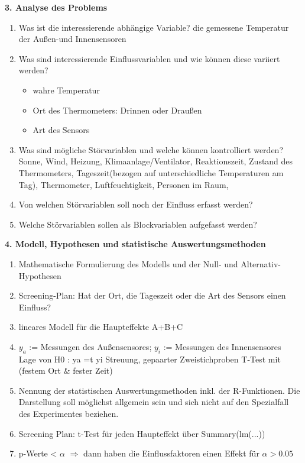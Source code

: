 \documentclass[ ngerman, fontsize= 12pt, paper=a4, headings=big, titlepage=true]{article}
\begin{document}
\textbf{3. Analyse des Problems}
\begin{enumerate}[-]
\item Was ist die interessierende abhängige Variable?
	die gemessene Temperatur der Außen-und Innensensoren
\item Was sind interessierende Einflussvariablen und wie können diese variiert werden? \\
\begin{itemize}
	\item wahre Temperatur\\
	\item Ort des Thermometers: Drinnen oder Draußen
	\item Art des Sensors 
\end{itemize}



\item Was sind mögliche Störvariablen und welche können kontrolliert werden?\\
Sonne, Wind, Heizung, Klimaanlage/Ventilator, Reaktionszeit, Zustand des Thermometers,  Tageszeit(bezogen auf unterschiedliche Temperaturen am Tag), Thermometer, Luftfeuchtigkeit, Personen im Raum,
\item Von welchen Störvariablen soll noch der Einfluss erfasst werden? \\
\item Welche Störvariablen sollen als Blockvariablen aufgefasst werden? \\
\end{enumerate}

\textbf{4. Modell, Hypothesen und statistische Auswertungsmethoden}
\begin{enumerate}[-]
\item  Mathematische Formulierung des Modells und der Null- und Alternativ-Hypothesen \\
\item Screening-Plan: Hat der Ort, die Tageszeit oder die Art des Sensors einen Einfluss?
\item lineares Modell für die Haupteffekte A+B+C
\item  $y_a$ := Messungen des Außensensores; $y_i$ := Messungen des Innensensores \\
Lage von H0 : ya =t yi Streuung, gepaarter Zweistichproben T-Test mit (festem Ort \& fester Zeit)

\item Nennung der statistischen Auswertungsmethoden inkl. der R-Funktionen. Die Darstellung soll möglichst allgemein sein und sich nicht auf den Spezialfall des Experimentes beziehen. \\

\item Screening Plan: t-Test für jeden Haupteffekt über Summary(lm(...))
\item p-Werte < $\alpha$ $\Rightarrow$ dann haben die Einflussfaktoren einen Effekt für $\alpha > 0.05$ 
\end{enumerate}
\end{document}
